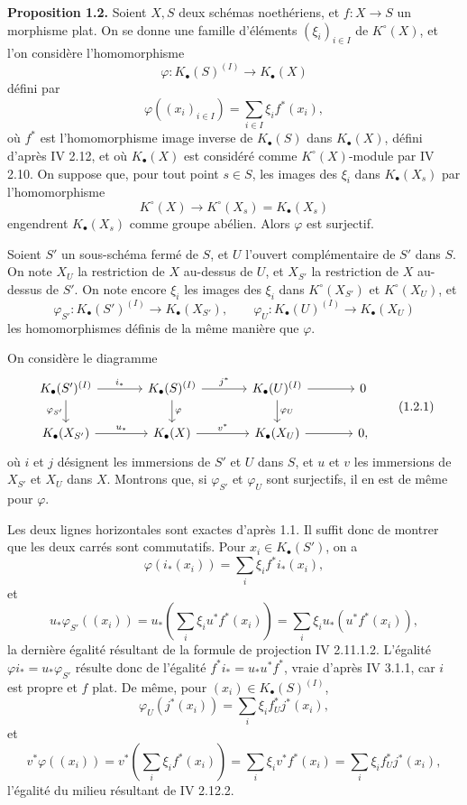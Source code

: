 \documentclass[11pt]{article}
\begin{document}
\textbf{Proposition 1.2.} Soient $X,S$ deux schémas noethériens, et $f:X\to S$ un morphisme plat. On se donne une famille d'éléments $(\xi_i)_{i\in I}$ de $K^\circ(X)$, et l'on considère l'homomorphisme
\[
\varphi:K_\bullet(S)^{(I)}\longrightarrow K_\bullet(X)
\]
défini par
\[
\varphi((x_i)_{i\in I})=\sum_{i\in I}\xi_i f^*(x_i),
\]
où $f^*$ est l'homomorphisme image inverse de $K_\bullet(S)$ dans $K_\bullet(X)$, défini d'après IV 2.12, et où $K_\bullet(X)$ est considéré comme $K^\circ(X)$-module par IV 2.10. On suppose que, pour tout point $s\in S$, les images des $\xi_i$ dans $K_\bullet(X_s)$ par l'homomorphisme
\[
K^\circ(X)\longrightarrow K^\circ(X_s)=K_\bullet(X_s)
\]
engendrent $K_\bullet(X_s)$ comme groupe abélien. Alors $\varphi$ est surjectif.

Soient $S'$ un sous-schéma fermé de $S$, et $U$ l'ouvert complémentaire de $S'$ dans $S$. On note $X_U$ la restriction de $X$ au-dessus de $U$, et $X_{S'}$ la restriction de $X$ au-dessus de $S'$. On note encore $\xi_i$ les images des $\xi_i$ dans $K^\circ(X_{S'})$ et $K^\circ(X_U)$, et
\[
\varphi_{S'}:K_\bullet(S')^{(I)}\to K_\bullet(X_{S'}),\qquad
\varphi_U:K_\bullet(U)^{(I)}\to K_\bullet(X_U)
\]
les homomorphismes définis de la même manière que $\varphi$.

On considère le diagramme
\[
\begin{tikzcd}[column sep=large]
K_\bullet(S')^{(I)} \arrow[r,"i_*"] \arrow[d,"\varphi_{S'}"'] & K_\bullet(S)^{(I)} \arrow[r,"j^*"] \arrow[d,"\varphi"] & K_\bullet(U)^{(I)} \arrow[r] \arrow[d,"\varphi_U"] & 0\\
K_\bullet(X_{S'}) \arrow[r,"u_*"] & K_\bullet(X) \arrow[r,"v^*"] & K_\bullet(X_U) \arrow[r] & 0,
\end{tikzcd}\tag{1.2.1}
\]
où $i$ et $j$ désignent les immersions de $S'$ et $U$ dans $S$, et $u$ et $v$ les immersions de $X_{S'}$ et $X_U$ dans $X$. Montrons que, si $\varphi_{S'}$ et $\varphi_U$ sont surjectifs, il en est de même pour $\varphi$.

Les deux lignes horizontales sont exactes d'après 1.1. Il suffit donc de montrer que les deux carrés sont commutatifs. Pour $x_i\in K_\bullet(S')$, on a
\[
\varphi(i_*(x_i))=\sum_i \xi_i f^*i_*(x_i),
\]
et
\[
u_*\varphi_{S'}((x_i))=u_*\left(\sum_i\xi_i u^*f^*(x_i)\right)
=\sum_i\xi_i u_*(u^*f^*(x_i)),
\]
la dernière égalité résultant de la formule de projection IV 2.11.1.2. L'égalité $\varphi i_*=u_*\varphi_{S'}$ résulte donc de l'égalité $f^*i_*=u_*u^*f^*$, vraie d'après IV 3.1.1, car $i$ est propre et $f$ plat. De même, pour $(x_i)\in K_\bullet(S)^{(I)}$,
\[
\varphi_U(j^*(x_i))=\sum_i\xi_i f_U^*j^*(x_i),
\]
et
\[
v^*\varphi((x_i))=v^*\left(\sum_i\xi_i f^*(x_i)\right)=\sum_i\xi_i v^*f^*(x_i)=\sum_i\xi_i f_U^*j^*(x_i),
\]
l'égalité du milieu résultant de IV 2.12.2.
\end{document}
